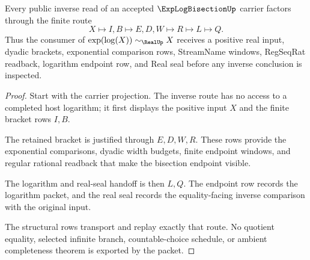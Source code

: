 \begin{theorem}
\label{thm:exp-log-bisection-inverse-handoff}
Every public inverse read of an accepted $\ExpLogBisectionUp$ carrier factors through the finite route
$$
X\longmapsto I,B\longmapsto E,D,W\longmapsto R\longmapsto L\longmapsto Q .
$$
Thus the consumer of $\exp(\log(X))\sim_{\RealUp}X$ receives a positive real input, dyadic brackets, exponential comparison rows, StreamName windows, RegSeqRat readback, logarithm endpoint row, and Real seal before any inverse conclusion is inspected.
\end{theorem}
\begin{proof}
Start with the carrier projection. The inverse route has no access to a completed host logarithm; it first displays the positive input $X$ and the finite bracket rows $I,B$.

The retained bracket is justified through $E,D,W,R$. These rows provide the exponential comparisons, dyadic width budgets, finite endpoint windows, and regular rational readback that make the bisection endpoint visible.

The logarithm and real-seal handoff is then $L,Q$. The endpoint row records the logarithm packet, and the real seal records the equality-facing inverse comparison with the original input.

The structural rows transport and replay exactly that route. No quotient equality, selected infinite branch, countable-choice schedule, or ambient completeness theorem is exported by the packet.
\end{proof}


\begin{closurestatus}{\ExpLogBisectionUp}
  \theoryclosure{\seedClosure}
  \formalstatus{\formalTargetV}
\end{closurestatus}
